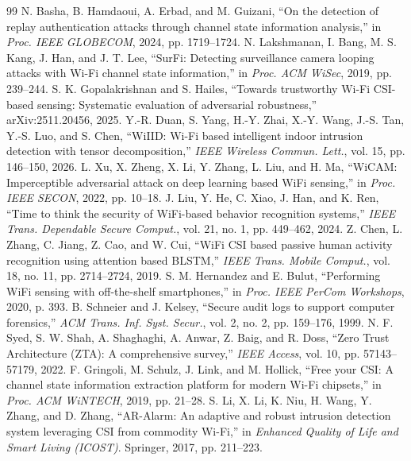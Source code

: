 \documentclass[conference]{IEEEtran}
\begin{document}
\begin{thebibliography}{99}
 N. Basha, B. Hamdaoui, A. Erbad, and M. Guizani, ``On the detection of replay authentication attacks through channel state information analysis,'' in \emph{Proc. IEEE GLOBECOM}, 2024, pp. 1719--1724.
 N. Lakshmanan, I. Bang, M. S. Kang, J. Han, and J. T. Lee, ``SurFi: Detecting surveillance camera looping attacks with Wi-Fi channel state information,'' in \emph{Proc. ACM WiSec}, 2019, pp. 239--244.
 S. K. Gopalakrishnan and S. Hailes, ``Towards trustworthy Wi-Fi CSI-based sensing: Systematic evaluation of adversarial robustness,'' arXiv:2511.20456, 2025.
 Y.-R. Duan, S. Yang, H.-Y. Zhai, X.-Y. Wang, J.-S. Tan, Y.-S. Luo, and S. Chen, ``WiIID: Wi-Fi based intelligent indoor intrusion detection with tensor decomposition,'' \emph{IEEE Wireless Commun. Lett.}, vol. 15, pp. 146--150, 2026.
 L. Xu, X. Zheng, X. Li, Y. Zhang, L. Liu, and H. Ma, ``WiCAM: Imperceptible adversarial attack on deep learning based WiFi sensing,'' in \emph{Proc. IEEE SECON}, 2022, pp. 10--18.
 J. Liu, Y. He, C. Xiao, J. Han, and K. Ren, ``Time to think the security of WiFi-based behavior recognition systems,'' \emph{IEEE Trans. Dependable Secure Comput.}, vol. 21, no. 1, pp. 449--462, 2024.
 Z. Chen, L. Zhang, C. Jiang, Z. Cao, and W. Cui, ``WiFi CSI based passive human activity recognition using attention based BLSTM,'' \emph{IEEE Trans. Mobile Comput.}, vol. 18, no. 11, pp. 2714--2724, 2019.
 S. M. Hernandez and E. Bulut, ``Performing WiFi sensing with off-the-shelf smartphones,'' in \emph{Proc. IEEE PerCom Workshops}, 2020, p. 393.
 B. Schneier and J. Kelsey, ``Secure audit logs to support computer forensics,'' \emph{ACM Trans. Inf. Syst. Secur.}, vol. 2, no. 2, pp. 159--176, 1999.
 N. F. Syed, S. W. Shah, A. Shaghaghi, A. Anwar, Z. Baig, and R. Doss, ``Zero Trust Architecture (ZTA): A comprehensive survey,'' \emph{IEEE Access}, vol. 10, pp. 57143--57179, 2022.
 F. Gringoli, M. Schulz, J. Link, and M. Hollick, ``Free your CSI: A channel state information extraction platform for modern Wi-Fi chipsets,'' in \emph{Proc. ACM WiNTECH}, 2019, pp. 21--28.
 S. Li, X. Li, K. Niu, H. Wang, Y. Zhang, and D. Zhang, ``AR-Alarm: An adaptive and robust intrusion detection system leveraging CSI from commodity Wi-Fi,'' in \emph{Enhanced Quality of Life and Smart Living (ICOST)}. Springer, 2017, pp. 211--223.
\end{thebibliography}
\end{document}
